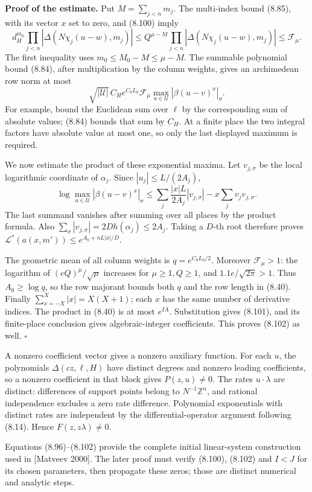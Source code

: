 \documentclass[
  11pt,
  a4paper,
]{article}
\begin{document}
\textbf{Proof of the estimate.} Put \(M=\sum_{j<n}m_j\). The multi-index
bound (8.85), with its vector \(x\) set to zero, and (8.100) imply \[
d_H^{m_0}
\prod_{j<n}|\Delta(N\chi_j(u-w),m_j)|
\le Q^{\mu-M}\prod_{j<n}|\Delta(N\chi_j(u-w),m_j)|
\le\mathcal F_\mu.
\] The first inequality uses \(m_0\le M_0-M\le\mu-M\). The summable
polynomial bound (8.84), after multiplication by the column weights,
gives an archimedean row norm at most \[
\sqrt{|\mathcal U|}\,C_H e^{C_0L_0}\mathcal F_\mu
\max_{u\in\mathcal U}|\beta(u-v)^x|_\sigma.
\] For example, bound the Euclidean sum over \(\ell\) by the
corresponding sum of absolute values; (8.84) bounds that sum by \(C_H\).
At a finite place the two integral factors have absolute value at most
one, so only the last displayed maximum is required.

We now estimate the product of these exponential maxima. Let
\(v_{j,\sigma}\) be the local logarithmic coordinate of \(\alpha_j\).
Since \(|u_j|\le L/(2A_j)\), \[
\log\max_{u\in\mathcal U}|\beta(u-v)^x|_\sigma
\le\sum_j\frac{|x|L}{2A_j}|v_{j,\sigma}|
-x\sum_jv_jv_{j,\sigma}.
\] The last summand vanishes after summing over all places by the
product formula. Also
\(\sum_\sigma|v_{j,\sigma}|=2Dh(\alpha_j)\le2A_j\). Taking a \(D\)-th
root therefore proves \(\mathcal L^*(a(x,m'))\le e^{A_0+nL|x|/D}\).

The geometric mean of all column weights is \(q=e^{C_0L_0/2}\). Moreover
\(\mathcal F_\mu>1\): the logarithm of \((eQ)^\mu/\sqrt\mu\) increases
for \(\mu\ge1,Q\ge1\), and \(1.1e/\sqrt{2\pi}>1\). Thus
\(A_0\ge\log q\), so the row majorant bounds both \(q\) and the row
length in (8.40). Finally \(\sum_{x=-X}^X|x|=X(X+1)\); each \(x\) has
the same number of derivative indices. The product in (8.40) is at most
\(e^{I\overline A}\). Substitution gives (8.101), and its finite-place
conclusion gives algebraic-integer coefficients. This proves (8.102) as
well. \(\square\)

A nonzero coefficient vector gives a nonzero auxiliary function. For
each \(u\), the polynomials \(\Delta(cz,\ell,H)\) have distinct degrees
and nonzero leading coefficients, so a nonzero coefficient in that block
gives \(P(z,u)\ne0\). The rates \(u\cdot\lambda\) are distinct:
differences of support points belong to \(N^{-1}\mathbb Z^n\), and
rational independence excludes a zero rate difference. Polynomial
exponentials with distinct rates are independent by the
differential-operator argument following (8.14). Hence
\(F(z,z\lambda)\ne0\).

Equations (8.96)--(8.102) provide the complete initial linear-system
construction used in {[}Matveev 2000{]}. The later proof must verify
(8.100), (8.102) and \(I<J\) for its chosen parameters, then propagate
these zeros; those are distinct numerical and analytic steps.
\end{document}
